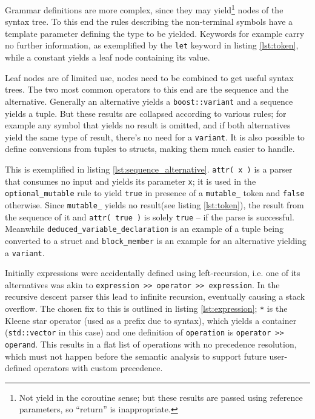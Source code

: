 		Grammar definitions are more complex, since they may yield\footnote{Not yield in the coroutine sense; but these results are passed using reference parameters, so ``return'' is inappropriate.} nodes of the syntax tree. To this end the rules describing the non-terminal symbols have a template parameter defining the type to be yielded. Keywords for example carry no further information, as exemplified by the \lstinline$let$ keyword in listing \ref{lst:token}, while a constant yields a leaf node containing its value.
		
		
		Leaf nodes are of limited use, nodes need to be combined to get useful syntax trees. The two most common operators to this end are the sequence and the alternative. Generally an alternative yields a \lstinline$boost::variant$ and a sequence yields a tuple. But these results are collapsed according to various rules\cite{spirit_attributes}; for example any symbol that yields no result is omitted, and if both alternatives yield the same type of result, there's no need for a \lstinline$variant$. It is also possible to define conversions from tuples to structs, making them much easier to handle.
		
		This is exemplified in listing \ref{lst:sequence_alternative}. \lstinline$attr( x )$ is a parser that consumes no input and yields its parameter \lstinline$x$; it is used in the \lstinline$optional_mutable$ rule to yield \lstinline$true$ in presence of a \lstinline$mutable_$ token and \lstinline$false$ otherwise. Since \lstinline$mutable_$ yields no result(see listing \ref{lst:token}), the result from the sequence of it and \lstinline$attr( true )$ is solely \lstinline$true$ -- if the parse is successful. Meanwhile \lstinline$deduced_variable_declaration$ is an example of a tuple being converted to a struct and \lstinline$block_member$ is an example for an alternative yielding a \lstinline$variant$.
		
		
		Initially expressions were accidentally defined using left-recursion, i.e. one of its alternatives was akin to \lstinline$expression >> operator >> expression$. In the recursive descent parser this lead to infinite recursion, eventually causing a stack overflow. The chosen fix to this is outlined in listing \ref{lst:expression}; \lstinline$*$ is the Kleene star operator (used as a prefix due to {\CC} syntax), which yields a container (\lstinline$std::vector$ in this case) and one definition of \lstinline$operation$ is \lstinline$operator >> operand$. This results in a flat list of operations with no precedence resolution, which must not happen before the semantic analysis to support future user-defined operators with custom precedence.
		
